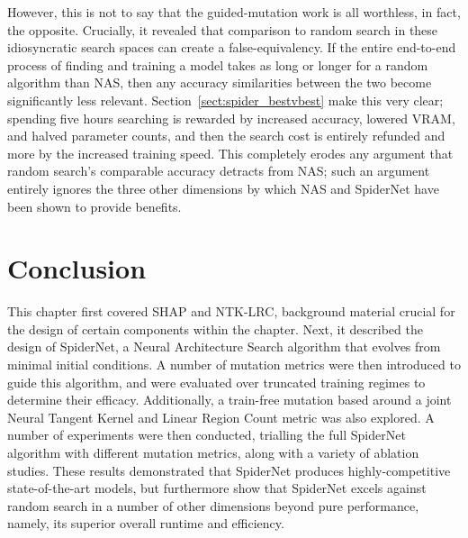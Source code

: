 However, this is not to say that the guided-mutation work is all worthless, in fact, the opposite. Crucially,
it revealed that comparison to random search in these idiosyncratic search spaces can create a false-equivalency. If
the entire end-to-end process of finding and training a model takes as long or longer for a random algorithm than
NAS, then any accuracy similarities between the two become significantly less relevant. Section~\ref{sect:spider_bestvbest}
make this very clear; spending five hours searching is rewarded by increased accuracy, lowered VRAM, and halved
parameter counts, and then the search cost is entirely refunded and more by the increased training speed. This completely
erodes any argument that random search's comparable accuracy detracts from NAS; such an argument entirely
ignores the three other dimensions by which NAS and SpiderNet have been shown to provide benefits.

\section{Conclusion}\label{sect:spider_conclusion}
This chapter first covered SHAP and NTK-LRC, background material crucial for the design of certain components within
the chapter. Next, it described the design of SpiderNet, a Neural Architecture Search algorithm that evolves from minimal initial
conditions. A number of mutation metrics were then introduced to guide this algorithm, and were evaluated over truncated
training regimes to determine their efficacy. Additionally, a train-free mutation based around a joint Neural Tangent
Kernel and Linear Region Count metric was also explored. A number of experiments were then conducted, trialling the full
SpiderNet algorithm with different mutation metrics, along with a variety of ablation studies. These results
demonstrated that SpiderNet produces highly-competitive state-of-the-art models, but furthermore show that SpiderNet
excels against random search in a number of other dimensions beyond pure performance, namely, its superior overall runtime
and efficiency.